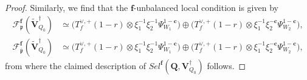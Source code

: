 \documentclass[10pt,a4paper]{amsart}
\newcommand{\Q}{\mathbf{Q}}
\newcommand{\Sel}{Sel}
\newcommand{\Vsdag}{{\mathbf{V}_{Q_0}^\dagger}}
\newcommand{\cc}{\mathbf{c}}
\newcommand{\ch}{\xi}
\newcommand{\ppbar}{\bar{\mathfrak{p}}}
\newcommand{\pp}{\mathfrak{p}}
\newcommand{\unb}{{\boldsymbol{f}}}
\begin{document}
\begin{proof}
Similarly, we find that the $\unb$-unbalanced local condition is given by
\begin{equation}
\begin{aligned}
\mathscr{F}^{\unb}_\pp(\widetilde{\mathbf{V}}_{Q_0}^\dagger)&\simeq\bigl(T_f^{\vee,+}(1-r)\otimes\ch_1^{-1}\ch_2^{-1}\Psi_{W_1}^{1-\cc}\bigr)\oplus\bigl(T_f^{\vee,+}(1-r)\otimes\ch_1^{-1}\ch_2^{-\cc}\Psi_{W_2}^{1-\cc}\bigr),\\
\mathscr{F}^{\unb}_{\ppbar}(\widetilde{\mathbf{V}}_{Q_0}^\dagger)&\simeq\bigl(T_f^{\vee,+}(1-r)\otimes\ch_1^{-1}\ch_2^{-1}\Psi_{W_1}^{1-\cc}\bigr)\oplus\bigl(T_f^{\vee,+}(1-r)\otimes\ch_1^{-1}\ch_2^{-\cc}\Psi_{W_2}^{1-\cc}\bigr),\nonumber
\end{aligned}
\end{equation}
from where the claimed description of $\Sel^\unb(\Q,\Vsdag)$ follows.
\end{proof}
\end{document}
